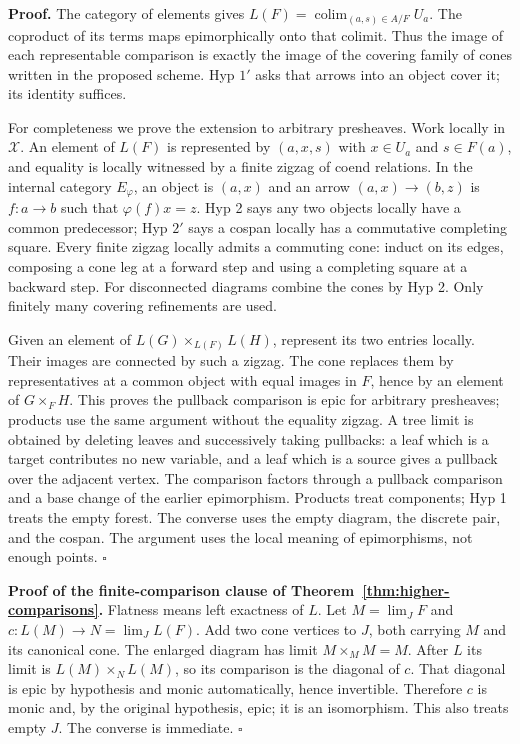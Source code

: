 \documentclass[11pt,a4paper]{article}
\theoremstyle{definition}
\begin{document}
\textbf{Proof.} The category of elements gives
\(L(F)=\operatorname{colim}_{(a,s)\in A/F}U_a\). The coproduct of its
terms maps epimorphically onto that colimit. Thus the image of each
representable comparison is exactly the image of the covering family of
cones written in the proposed scheme. Hyp \(1'\) asks that arrows into an
object cover it; its identity suffices.

For completeness we prove the extension to arbitrary presheaves. Work
locally in \(\mathcal X\). An element of \(L(F)\) is represented by
\((a,x,s)\) with \(x\in U_a\) and \(s\in F(a)\), and equality is locally
witnessed by a finite zigzag of coend relations. In the internal
category \(E_\varphi\), an object is \((a,x)\) and an arrow
\((a,x)\to(b,z)\) is \(f:a\to b\) such that \(\varphi(f)x=z\). Hyp 2
says any two objects locally have a common predecessor; Hyp \(2'\) says
a cospan locally has a commutative completing square. Every finite
zigzag locally admits a commuting cone: induct on its edges, composing a
cone leg at a forward step and using a completing square at a backward
step. For disconnected diagrams combine the cones by Hyp 2. Only
finitely many covering refinements are used.

Given an element of \(L(G)\times_{L(F)}L(H)\), represent its two entries
locally. Their images are connected by such a zigzag. The cone replaces
them by representatives at a common object with equal images in \(F\),
hence by an element of \(G\times_FH\). This proves the pullback
comparison is epic for arbitrary presheaves; products use the same
argument without the equality zigzag. A tree limit is obtained by
deleting leaves and successively taking pullbacks: a leaf which is a
target contributes no new variable, and a leaf which is a source gives a
pullback over the adjacent vertex. The comparison factors through a
pullback comparison and a base change of the earlier epimorphism.
Products treat components; Hyp 1 treats the empty forest. The converse
uses the empty diagram, the discrete pair, and the cospan. The argument
uses the local meaning of epimorphisms, not enough points. \(\square\)

\textbf{Proof of the finite-comparison clause of Theorem~\ref{thm:higher-comparisons}.} Flatness means left exactness of \(L\).
Let \(M=\lim_JF\) and \(c:L(M)\to N=\lim_JL(F)\). Add
two cone vertices to \(J\), both carrying \(M\) and its canonical cone.
The enlarged diagram has limit \(M\times_M M=M\). After \(L\) its limit
is \(L(M)\times_NL(M)\), so its comparison is the diagonal of \(c\).
That diagonal is epic by hypothesis and monic automatically, hence
invertible. Therefore \(c\) is monic and, by the original hypothesis,
epic; it is an isomorphism. This also treats empty \(J\). The converse
is immediate. \(\square\)
\end{document}
